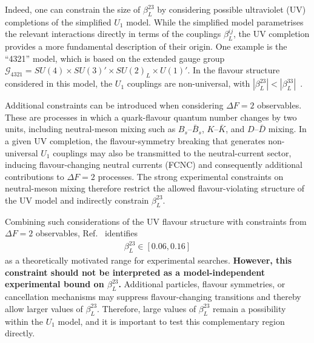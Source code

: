 Indeed, one can constrain the size of $\beta_L^{23}$ by considering possible ultraviolet (UV) completions of the simplified $U_{1}$ model. While the simplified model parametrises the relevant interactions directly in terms of the couplings $\beta_{L}^{ij}$, the UV completion provides a more fundamental description of their origin. One example is the ``4321'' model, which is based on the extended gauge group $\mathcal{G}_{4321}=SU(4)\times SU(3)'\times SU(2)_L \times U(1)'$. In the flavour structure considered in this model, the $U_1$ couplings are non-universal, with $|\beta_{L}^{23}|<|\beta_{L}^{33}|$~\cite{Cornella2019}.

Additional constraints can be introduced when considering $\Delta F=2$ observables. These are processes in which a quark-flavour quantum number changes by two units, including neutral-meson mixing such as $B_s$--$\bar{B}_s$, $K$--$\bar{K}$, and $D$--$\bar{D}$ mixing. In a given UV completion, the flavour-symmetry breaking that generates non-universal $U_{1}$ couplings may also be transmitted to the neutral-current sector, inducing flavour-changing neutral currents (FCNC) and consequently additional contributions to $\Delta F=2$ processes. The strong experimental constraints on neutral-meson mixing therefore restrict the allowed flavour-violating structure of the UV model and indirectly constrain $\beta_{L}^{23}$.

Combining such considerations of the UV flavour structure with constraints from $\Delta F=2$ observables, Ref.~\cite{Aebischer2022} identifies
\begin{align}
\beta_{L}^{23}\in[0.06,0.16]
\end{align} as a theoretically motivated range for experimental searches. \textbf{However, this constraint should not be interpreted as a model-independent experimental bound on $\beta_{L}^{23}$.} Additional particles, flavour symmetries, or cancellation mechanisms may suppress flavour-changing transitions and thereby allow larger values of $\beta_{L}^{23}$. Therefore, large values of $\beta_{L}^{23}$ remain a possibility within the $U_{1}$ model, and it is important to test this complementary region directly.


